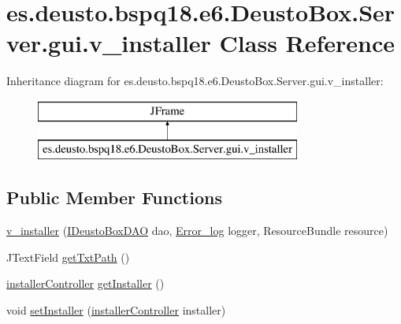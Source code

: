 \hypertarget{classes_1_1deusto_1_1bspq18_1_1e6_1_1_deusto_box_1_1_server_1_1gui_1_1v__installer}{}\section{es.\+deusto.\+bspq18.\+e6.\+Deusto\+Box.\+Server.\+gui.\+v\+\_\+installer Class Reference}
\label{classes_1_1deusto_1_1bspq18_1_1e6_1_1_deusto_box_1_1_server_1_1gui_1_1v__installer}
Inheritance diagram for es.\+deusto.\+bspq18.\+e6.\+Deusto\+Box.\+Server.\+gui.\+v\+\_\+installer\+:\begin{figure}[H]
\begin{center}
\leavevmode
\includegraphics[height=2.000000cm]{classes_1_1deusto_1_1bspq18_1_1e6_1_1_deusto_box_1_1_server_1_1gui_1_1v__installer}
\end{center}
\end{figure}
\subsection*{Public Member Functions}
\begin{DoxyCompactItemize}
\item 
\mbox{\hyperlink{classes_1_1deusto_1_1bspq18_1_1e6_1_1_deusto_box_1_1_server_1_1gui_1_1v__installer_a63b91c971d203d179dd36f1366e4cfda}{v\+\_\+installer}} (\mbox{\hyperlink{interfacees_1_1deusto_1_1bspq18_1_1e6_1_1_deusto_box_1_1_server_1_1jdo_1_1dao_1_1_i_deusto_box_d_a_o}{I\+Deusto\+Box\+D\+AO}} dao, \mbox{\hyperlink{classes_1_1deusto_1_1bspq18_1_1e6_1_1_deusto_box_1_1_server_1_1utils_1_1_error__log}{Error\+\_\+log}} logger, Resource\+Bundle resource)
\item 
J\+Text\+Field \mbox{\hyperlink{classes_1_1deusto_1_1bspq18_1_1e6_1_1_deusto_box_1_1_server_1_1gui_1_1v__installer_a5ec6edb5ef2def9839d072baebccf23f}{get\+Txt\+Path}} ()
\item 
\mbox{\hyperlink{classes_1_1deusto_1_1bspq18_1_1e6_1_1_deusto_box_1_1_server_1_1gui_1_1installer_controller}{installer\+Controller}} \mbox{\hyperlink{classes_1_1deusto_1_1bspq18_1_1e6_1_1_deusto_box_1_1_server_1_1gui_1_1v__installer_a54601c01555a191f32f6c1a1c27aa95c}{get\+Installer}} ()
\item 
void \mbox{\hyperlink{classes_1_1deusto_1_1bspq18_1_1e6_1_1_deusto_box_1_1_server_1_1gui_1_1v__installer_a97379a2b34e46c84867f52b77ef016f7}{set\+Installer}} (\mbox{\hyperlink{classes_1_1deusto_1_1bspq18_1_1e6_1_1_deusto_box_1_1_server_1_1gui_1_1installer_controller}{installer\+Controller}} installer)
\end{DoxyCompactItemize}
